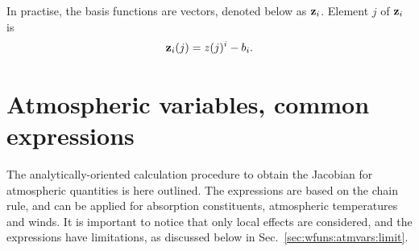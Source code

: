 In practise, the basis functions are vectors, denoted below as $\mathbf{z}_i$.
Element $j$ of $\mathbf{z}_i$ is
\begin{equation}
  \mathbf{z}_i(j) = z(j)^i - b_i.
\end{equation}




\section{Atmospheric variables, common expressions}
\label{sec:wfuns:atmvars}
%
The analytically-oriented calculation procedure to obtain the Jacobian for
atmospheric quantities is here outlined. The expressions are based on the
chain rule, and can be applied for absorption constituents, atmospheric
temperatures and winds. It is important to notice that only local effects are
considered, and the expressions have limitations, as discussed below in
Sec.~\ref{sec:wfuns:atmvars:limit}.


